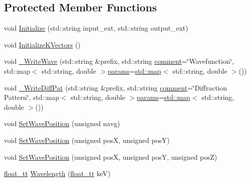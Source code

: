 \subsection*{Protected Member Functions}
\begin{DoxyCompactItemize}
\item 
void \hyperlink{class_q_s_t_e_m_1_1_c_base_wave_a212673ef34f962fc714f117c50f01006}{Initialize} (std\-::string input\-\_\-ext, std\-::string output\-\_\-ext)
\item 
void \hyperlink{class_q_s_t_e_m_1_1_c_base_wave_a07e971c0248d0fa244f9edb3dc585f94}{Initialize\-K\-Vectors} ()
\item 
void \hyperlink{class_q_s_t_e_m_1_1_c_base_wave_aaef74a98288be0406629d6db0dcc20af}{\-\_\-\-Write\-Wave} (std\-::string \&prefix, std\-::string \hyperlink{image_sim_8m_aea4cc4bd8e43a7f8ebf9b0ee3da8d681}{comment}=\char`\"{}Wavefunction\char`\"{}, std\-::map$<$ std\-::string, double $>$\hyperlink{image_sim_8m_ad57b218fb254a1624c09ad71cb6b6415}{params}=\hyperlink{_displacement_params_8m_af619c74fd72bdb64d115463dff2720cd}{std\-::map}$<$ std\-::string, double $>$())
\item 
void \hyperlink{class_q_s_t_e_m_1_1_c_base_wave_a1ada3b973701105cd6fa43afdc1e8f6c}{\-\_\-\-Write\-Diff\-Pat} (std\-::string \&prefix, std\-::string \hyperlink{image_sim_8m_aea4cc4bd8e43a7f8ebf9b0ee3da8d681}{comment}=\char`\"{}Diffraction Pattern\char`\"{}, std\-::map$<$ std\-::string, double $>$\hyperlink{image_sim_8m_ad57b218fb254a1624c09ad71cb6b6415}{params}=\hyperlink{_displacement_params_8m_af619c74fd72bdb64d115463dff2720cd}{std\-::map}$<$ std\-::string, double $>$())
\item 
void \hyperlink{class_q_s_t_e_m_1_1_c_base_wave_a3822bdafbebc7c6621094b76c14c40f5}{Set\-Wave\-Position} (unsigned navg)
\item 
void \hyperlink{class_q_s_t_e_m_1_1_c_base_wave_ac3886c6ab85d54bb67461e9b82205824}{Set\-Wave\-Position} (unsigned pos\-X, unsigned pos\-Y)
\item 
void \hyperlink{class_q_s_t_e_m_1_1_c_base_wave_a789465c08bd9036244df577d3302670d}{Set\-Wave\-Position} (unsigned pos\-X, unsigned pos\-Y, unsigned pos\-Z)
\item 
\hyperlink{namespace_q_s_t_e_m_a915d7caa497280d9f927c4ce8d330e47}{float\-\_\-tt} \hyperlink{class_q_s_t_e_m_1_1_c_base_wave_a8011eef696b446a889aa708b033beaed}{Wavelength} (\hyperlink{namespace_q_s_t_e_m_a915d7caa497280d9f927c4ce8d330e47}{float\-\_\-tt} ke\-V)
\end{DoxyCompactItemize}
